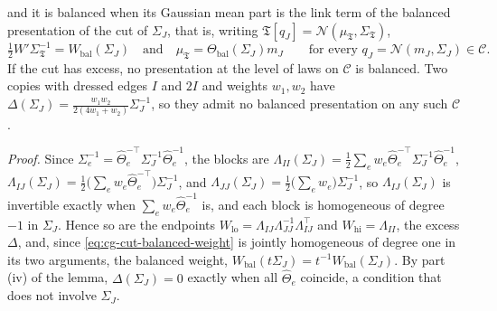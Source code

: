 and it is balanced when its Gaussian mean part is the link term of the balanced presentation of the cut of
$\Sigma_J$, that is, writing $\mathfrak T[q_J]=\mathcal N(\mu_{\mathfrak T},\Sigma_{\mathfrak T})$,
\begin{equation}
\tfrac12W'\Sigma_{\mathfrak T}^{-1}=W_{\mathrm{bal}}(\Sigma_J)\quad\text{and}\quad\mu_{\mathfrak T}=\Theta_{\mathrm{bal}}(\Sigma_J)m_J
\qquad\text{for every }q_J=\mathcal N(m_J,\Sigma_J)\in\mathscr C.
\label{eq:cg-cut-law-balance}
\end{equation}
If the cut has excess, no presentation at the level of laws on $\mathscr C$ is balanced. Two copies with dressed
edges $I$ and $2I$ and weights $w_1,w_2$ have $\Delta(\Sigma_J)=\frac{w_1w_2}{2(4w_1+w_2)}\Sigma_J^{-1}$, so they
admit no balanced presentation on any such $\mathscr C$. 

\noindent\emph{Proof.}
Since $\Sigma_e^{-1}=\widehat\Theta_e^{-\top}\Sigma_J^{-1}\widehat\Theta_e^{-1}$, the blocks are
$\Lambda_{II}(\Sigma_J)=\tfrac12\sum_ew_e\widehat\Theta_e^{-\top}\Sigma_J^{-1}\widehat\Theta_e^{-1}$,
$\Lambda_{IJ}(\Sigma_J)=\tfrac12\bigl(\sum_ew_e\widehat\Theta_e^{-\top}\bigr)\Sigma_J^{-1}$, and
$\Lambda_{JJ}(\Sigma_J)=\tfrac12\bigl(\sum_ew_e\bigr)\Sigma_J^{-1}$, so $\Lambda_{IJ}(\Sigma_J)$ is invertible
exactly when $\sum_ew_e\widehat\Theta_e^{-1}$ is, and each block is homogeneous of degree $-1$ in $\Sigma_J$.
Hence so are the endpoints $W_{\mathrm{lo}}=\Lambda_{IJ}\Lambda_{JJ}^{-1}\Lambda_{IJ}^\top$ and
$W_{\mathrm{hi}}=\Lambda_{II}$, the excess $\Delta$, and, since \eqref{eq:cg-cut-balanced-weight} is jointly
homogeneous of degree one in its two arguments, the balanced weight,
$W_{\mathrm{bal}}(t\Sigma_J)=t^{-1}W_{\mathrm{bal}}(\Sigma_J)$. By part (iv) of the lemma, $\Delta(\Sigma_J)=0$
exactly when all $\widehat\Theta_e$ coincide, a condition that does not involve $\Sigma_J$.

